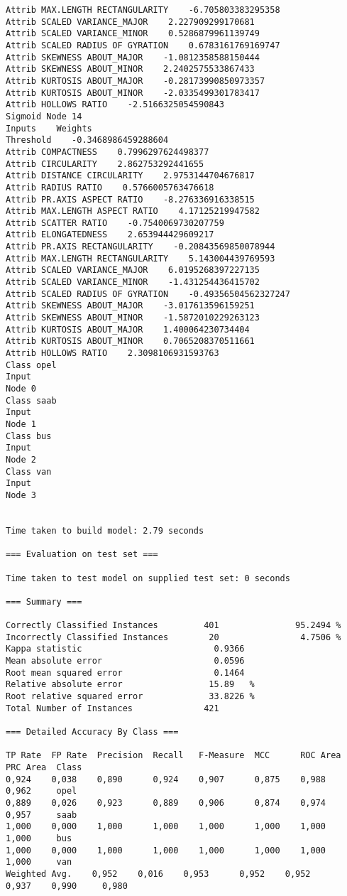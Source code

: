 \documentclass[
	article,			%
	11pt,				%
	oneside,			%
	a4paper,			%
	english,			%
	brazil,				%
	sumario=tradicional
	]{abntex2}
\begin{document}
\begin{lstlisting}
Attrib MAX.LENGTH RECTANGULARITY    -6.705803383295358
Attrib SCALED VARIANCE_MAJOR    2.227909299170681
Attrib SCALED VARIANCE_MINOR    0.5286879961139749
Attrib SCALED RADIUS OF GYRATION    0.6783161769169747
Attrib SKEWNESS ABOUT_MAJOR    -1.0812358588150444
Attrib SKEWNESS ABOUT_MINOR    2.2402575533867433
Attrib KURTOSIS ABOUT_MAJOR    -0.28173990850973357
Attrib KURTOSIS ABOUT_MINOR    -2.0335499301783417
Attrib HOLLOWS RATIO    -2.5166325054590843
Sigmoid Node 14
Inputs    Weights
Threshold    -0.3468986459288604
Attrib COMPACTNESS    0.7996297624498377
Attrib CIRCULARITY    2.862753292441655
Attrib DISTANCE CIRCULARITY    2.9753144704676817
Attrib RADIUS RATIO    0.5766005763476618
Attrib PR.AXIS ASPECT RATIO    -8.276336916338515
Attrib MAX.LENGTH ASPECT RATIO    4.17125219947582
Attrib SCATTER RATIO    -0.7540069730207759
Attrib ELONGATEDNESS    2.653944429609217
Attrib PR.AXIS RECTANGULARITY    -0.20843569850078944
Attrib MAX.LENGTH RECTANGULARITY    5.143004439769593
Attrib SCALED VARIANCE_MAJOR    6.0195268397227135
Attrib SCALED VARIANCE_MINOR    -1.431254436415702
Attrib SCALED RADIUS OF GYRATION    -0.49356504562327247
Attrib SKEWNESS ABOUT_MAJOR    -3.017613596159251
Attrib SKEWNESS ABOUT_MINOR    -1.5872010229263123
Attrib KURTOSIS ABOUT_MAJOR    1.400064230734404
Attrib KURTOSIS ABOUT_MINOR    0.7065208370511661
Attrib HOLLOWS RATIO    2.3098106931593763
Class opel
Input
Node 0
Class saab
Input
Node 1
Class bus
Input
Node 2
Class van
Input
Node 3


Time taken to build model: 2.79 seconds

=== Evaluation on test set ===

Time taken to test model on supplied test set: 0 seconds

=== Summary ===

Correctly Classified Instances         401               95.2494 %
Incorrectly Classified Instances        20                4.7506 %
Kappa statistic                          0.9366
Mean absolute error                      0.0596
Root mean squared error                  0.1464
Relative absolute error                 15.89   %
Root relative squared error             33.8226 %
Total Number of Instances              421     

=== Detailed Accuracy By Class ===

TP Rate  FP Rate  Precision  Recall   F-Measure  MCC      ROC Area  PRC Area  Class
0,924    0,038    0,890      0,924    0,907      0,875    0,988     0,962     opel
0,889    0,026    0,923      0,889    0,906      0,874    0,974     0,957     saab
1,000    0,000    1,000      1,000    1,000      1,000    1,000     1,000     bus
1,000    0,000    1,000      1,000    1,000      1,000    1,000     1,000     van
Weighted Avg.    0,952    0,016    0,953      0,952    0,952      0,937    0,990     0,980     


\end{lstlisting}
\end{document}
